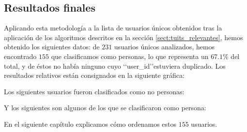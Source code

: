 \subsection{Resultados finales}
Aplicando esta metodología a la lista de usuarios únicos obtenidos tras la aplicación
de los algoritmos descritos en la sección \ref{sect:tuits_relevantes}, 
hemos obtenido los siguientes datos: de $231$ usuarios únicos analizados, 
hemos encontrado $155$ que clasificamos como 
personas, lo que representa un $67.1$\%  del total, y de éstos
no había ninguno cuyo \lq\lq user\_id\rq\rq estuviera duplicado. Los resultados relativos están consignados en la siguiente gráfica:



Los siguientes usuarios fueron clasificados como no personas:




Y los siguientes son algunos de los que se clasificaron como persona:



En el siguiente capítulo explicamos cómo ordenamos estos $155$ usuarios.
